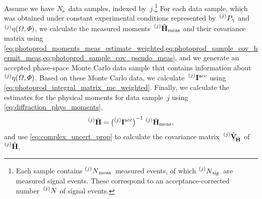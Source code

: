 Assume we have $N_\text{s}$~data samples, indexed
by~$j$.\footnote{Each sample contains
$\prescript{(j)}{}{N}_\text{meas}$~measured events, of which
$\prescript{(j)}{}{N}_\text{sig}$~are measured signal events. These
correspond to an acceptance-corrected number~$\prescript{(j)}{}{N}$ of
signal events.}  For each data sample, which was obtained under
constant experimental conditions represented
by~$\prescript{(j)}{}{P_\gamma}$ and $\prescript{(j)}{}{\eta}(\Omega,
\Phi)$, we calculate the measured
moments~$\prescript{(j)}{}{\vphantom{\vect{H}}}\hat{\vect{H}}_\text{meas}$
and their covariance matrix using
\cref{eq:photoprod_moments_meas_estimate_weighted,eq:photoprod_sample_cov_hermit_meas,eq:photoprod_sample_cov_pseudo_meas},
and we generate an accepted phase-space Monte Carlo data sample that
contains information about $\prescript{(j)}{}{\eta}(\Omega, \Phi)$.
Based on these Monte Carlo data, we
calculate~$\prescript{(j)}{}{\ensuremath{\bm{\mathrm{I}}}}^\text{acc}$ using
\cref{eq:photoprod_integral_matrix_mc_weighted}.  Finally, we
calculate the estimates for the physical moments for data sample~$j$
using \cref{eq:diffraction_phys_moments}, \ie
\begin{equation}
  \label{eq:photoprod_data_sample_phys_moments}
  \prescript{(j)}{}{\vphantom{\vect{H}}}\hat{\vect{H}}
  = \rBrk[1]{\prescript{(j)}{}{\mat{I}}^\text{acc}}^{-1}\,
  \prescript{(j)}{}{\vphantom{\vect{H}}}\hat{\vect{H}}_\text{meas},
\end{equation}
and use \cref{eq:complex_uncert_prop} to calculate the covariance
matrix~$\prescript{(j)}{}{\vphantom{\vect{H}}}\hat{\underaccent{\bar}{\covMatSym}}_{\!\hat{\vect{H}}}$
of~$\prescript{(j)}{}{\vphantom{\vect{H}}}\hat{\vect{H}}$.

